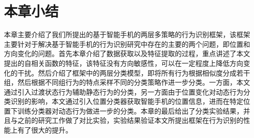  \section{本章小结}
 \par 本章主要介绍了我们所提出的基于智能手机的两层多策略的行为识别框架，该框架主要针对于解决基于智能手机的行为识别研究中存在的主要的两个问题，即位置和方向变化的问题。首先本章介绍了数据获取以及特征提取的过程，重点讲述了本文提出的自相关函数的特征，该特征没有方向敏感性，可以在一定程度上降低方向变化的干扰。然后介绍了框架中的两层分类模型，即将所有行为根据相似度分成若干组，然后根据不同组行为的特点采样不同的分类策略作进一步分类。一方面，本文通过引入过渡状态行为辅助静态行为的分类，另一方面由于位置变化对动态行为分类识别的影响，本文通过引入位置分类器获取智能手机的位置信息，进而在特定位置下训练分类器对动态行为做进一步的分类。本章的最后给出了分类实验结果，并且与之前的研究工作做了对比实验，实验结果验证本文所提出框架在行为识别的性能上有了很大的提升。
